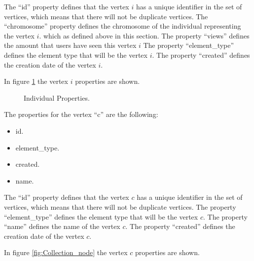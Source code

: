 The “id” property defines that the vertex $i$ has a unique identifier in the set
of vertices, which means that there will not be duplicate vertices. The
“chromosome” property defines the chromosome of the individual representing the
vertex $i$. which as defined above in this section. The  property “views” defines
the amount that users have seen this vertex $i$ The property “element\_type”
defines the element type that will be the vertex $i$. The property “created”
defines the creation date of the vertex $i$.


In figure \ref{fig:Individual_node} the vertex $i$ properties are shown.

\begin{figure}
\captionsetup{justification=centering,margin=2cm}
\centering
\setlength\fboxsep{0pt}
\setlength\fboxrule{0.7pt}
\caption{Individual Properties.}
\label{fig:Individual_node}
\end{figure}

The properties for the vertex “c” are the following:

\begin{itemize}
\item id.
\item element\_type.
\item created.
\item name.
\end{itemize}

The “id” property defines that the vertex $c$ has a unique identifier in the set
of vertices, which means that there will not be duplicate vertices. The property
“element\_type” defines the element type that will be the vertex $c$. The
property “name” defines the name of the vertex $c$. The property “created”
defines the creation date of the vertex $c$.

In figure \ref{fig:Collection_node} the vertex $c$ properties are shown.

